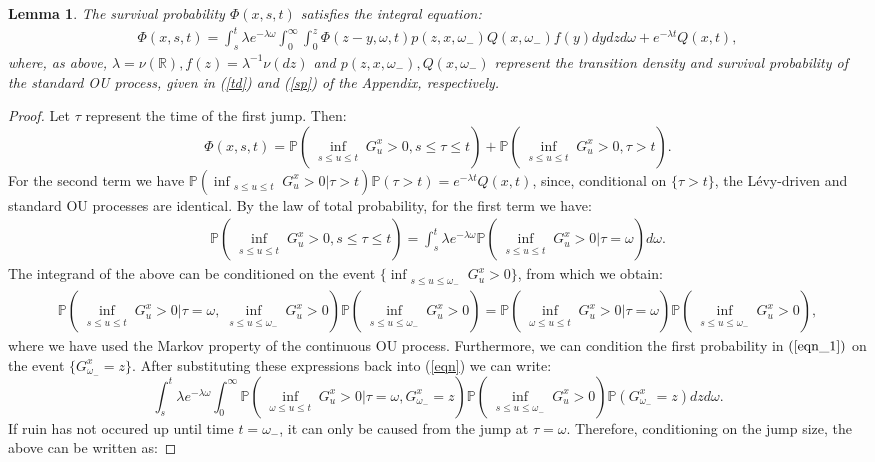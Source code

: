 \documentclass[11pt,reqno]{article}
\newtheorem{lemma}[theorem]{Lemma}
\theoremstyle{definition}
\begin{document}
\begin{lemma}\label{integral_eqn_1}
	The survival probability $\Phi(x,s,t)$ satisfies the integral equation:
	\begin{eqnarray}\label{eqn}
		\Phi(x,s,t)=  \int_{s}^{t} \lambda e^{-\lambda \omega} \int_{0}^{\infty} \int_{0}^{z} \Phi(z-y,\omega,t) p(z,x,\omega_-) Q(x,\omega_-)f(y)dydzd\omega + e^{-\lambda t}Q(x,t),
	\end{eqnarray}
	where, as above, $\lambda = \nu(\mathbb{R}), f(z)=\lambda^{-1} \nu(dz)$ and $p(z,x,\omega_-), Q(x, \omega_-)$ represent the transition density and survival probability of the standard OU process, given in (\ref{td}) and (\ref{sp}) of the Appendix, respectively.
\end{lemma}
\begin{proof}
	Let $\tau$ represent the time of the first jump. Then:
	$$\Phi(x,s,t)= \mathbb{P}(\inf_{\substack{s \leq u \leq t}}G_u^x >0 , s \leq \tau \leq t) + \mathbb{P}(\inf_{\substack{s \leq u \leq t}}G_u^x >0 , \tau > t).$$
	For the second term we have $\mathbb{P}(\inf_{\substack{s \leq u \leq t}}G_u^x >0|\tau >t) \mathbb{P}( \tau > t)=e^{-\lambda t} Q(x,t)$, since, conditional on $\{\tau >t \}$, the L\'evy-driven and standard OU processes are identical. By the law of total probability, for the first term we have: 
	\begin{eqnarray}
		\mathbb{P}(\inf_{\substack{s \leq u \leq t}}G_u^x >0 , s \leq \tau \leq t) = \int_{s}^{t} \lambda e^{-\lambda \omega} \mathbb{P}(\inf_{\substack{s \leq u \leq t}}G_u^x >0|\tau=\omega) d\omega.
	\end{eqnarray}
	The integrand of the above can be conditioned on the event $\{\inf_{\substack{s \leq u \leq \omega_-}}G_u^x>0\}$, from which we obtain:
	\begin{eqnarray}\label{eqn_1}
		 \mathbb{P}(\inf_{\substack{s \leq u \leq t}}G_u^x >0|\tau=\omega, \inf_{\substack{s \leq u \leq \omega_-}}G_u^x >0) \mathbb{P}(\inf_{\substack{s \leq u \leq \omega_-}}G_u^x >0)  = \mathbb{P}(\inf_{\substack{\omega \leq u \leq t}}G_u^x >0|\tau=\omega)  \mathbb{P}(\inf_{\substack{s \leq u \leq \omega_-}}G_u^x >0),
		\end{eqnarray}
	where we have used the Markov property of the continuous OU process. Furthermore, we can condition the first probability in $(\ref{eqn_1})$ on the event $\{G_{\omega_-}^x=z\}$. After substituting these expressions back into (\ref{eqn}) we can write:
	$$\int_{s}^{t} \lambda e^{-\lambda \omega} \int_{0}^{\infty} \mathbb{P}(\inf_{\substack{\omega \leq u \leq t}}G_u^x >0|\tau=\omega,  G_{\omega_-}^x=z) \mathbb{P}(\inf_{\substack{s \leq u \leq \omega_-}}G_u^x >0) \mathbb{P}(G_{\omega_-}^x=z) dzd\omega.$$If ruin has not occured up until time $t=\omega_-$, it can only be caused from the jump at $\tau=\omega$. Therefore, conditioning on the jump size, the above can be written as: 

\end{proof}
\end{document}
